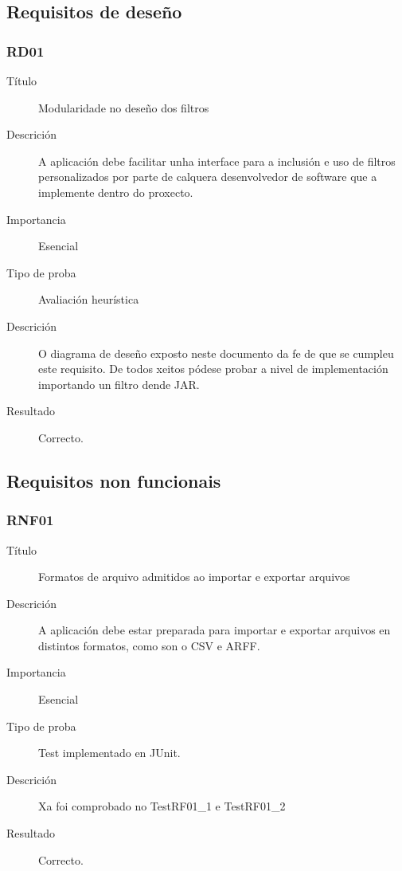 \subsection{Requisitos de deseño}

\subsubsection*{RD01}
\begin{description}
\item[Título] \hfill
Modularidade no deseño dos filtros
\item[Descrición] \hfill
A aplicación debe facilitar unha interface para a inclusión e uso de filtros personalizados por parte de calquera desenvolvedor de software que a implemente dentro do proxecto.
\item[Importancia] \hfill
Esencial
\item[Tipo de proba] \hfill
Avaliación heurística
\item[Descrición]
O diagrama de deseño exposto neste documento da fe de que se cumpleu este requisito. De todos xeitos pódese probar a nivel de implementación importando un filtro dende JAR.
\item[Resultado]
Correcto.
\end{description}

\subsection{Requisitos non funcionais}

\subsubsection*{RNF01}
\begin{description}
\item[Título] \hfill
Formatos de arquivo admitidos ao importar e exportar arquivos
\item[Descrición] \hfill
A aplicación debe estar preparada para importar e exportar arquivos en distintos formatos, como son o CSV e ARFF.
\item[Importancia] \hfill
Esencial
\item[Tipo de proba] \hfill
Test implementado en JUnit.
\item[Descrición]
Xa foi comprobado no TestRF01\_1 e TestRF01\_2
\item[Resultado]
Correcto.
\end{description}

